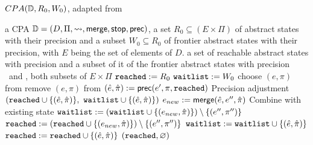 \begin{algorithm}[t]
\caption{$CPA(\mathbb{D}, R_0, W_0)$, adapted from \cite{Beyer2013}}
\label{alg:CPA}
\begin{algorithmic}[1]

\Input a CPA $\mathbb{D} = (D, \Pi, \rightsquigarrow, \operatorname{\operatorname{\mathsf{merge}}}, \operatorname{\operatorname{\mathsf{stop}}}, \operatorname{\operatorname{\mathsf{prec}}})$,
	    a set $R_0 \subseteq (E \times \Pi)$ of abstract states with their precision and 
      a subset $W_0 \subseteq R_0$ of frontier abstract states with their precision,
      with $E$ being the set of elements of $D$.
\Output a set of reachable abstract states with precision and
        a subset of it of the frontier abstract states with precision
\Variables \reachedSet\ and \waitlistSet , both subsets of $E \times \Pi$
\State $\texttt{reached} := R_0$
\State $\texttt{waitlist} := W_0$
\While{$\waitlistSet \neq \varnothing$}
	\State choose $(e, \pi)$ from \waitlistSet
	\State remove $(e, \pi)$ from \waitlistSet
		\State $(\hat{e}, \hat{\pi}) := \operatorname{\operatorname{\mathsf{prec}}}(e', \pi, \texttt{reached})$ \Comment Precision adjustment \label{alg:cpaPlus:precAdj}
		 \label{alg:cpa:isTarget}
			\State %
			\Return $(\reachedSet \cup \{ (\hat{e}, \hat{\pi}) \},\ \waitlistSet \cup \{ (\hat{e}, \hat{\pi}) \})$
		\EndIf
			\State $e_{new} := \operatorname{\operatorname{\mathsf{merge}}}(\hat{e}, e'', \hat{\pi})$ \Comment Combine with existing state \label{alg:cpa:mergeStart}
				\State $\texttt{waitlist} := (\texttt{waitlist} \cup \{ (e_{new}, \hat{\pi}) \}) \setminus \{ (e'',\pi '') \}$
				\State $\texttt{reached} := (\texttt{reached} \cup \{ (e_{new}, \hat{\pi}) \}) \setminus \{ (e'', \pi '') \}$
			\EndIf \label{alg:cpa:mergeStop}
		\EndFor
			\State $\texttt{waitlist} := \texttt{waitlist} \cup \{ (\hat{e}, \hat{\pi}) \}$
			\State $\texttt{reached} := \texttt{reached} \cup \{ (\hat{e}, \hat{\pi}) \}$
		\EndIf
	\EndFor
\EndWhile
\State %
\Return $(\texttt{reached}, \varnothing)$
\end{algorithmic}
\end{algorithm}

